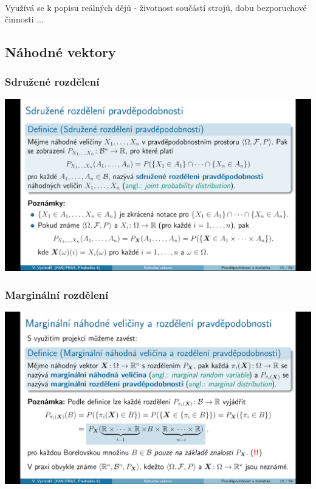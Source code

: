 \documentclass[12pt,a4paper]{article}
\begin{document}
\paragraph{} Využívá se k popisu reálných dějů - životnost součástí strojů, dobu bezporuchové činnosti ...

\subsection{Náhodné vektory}
\subsubsection{Sdružené rozdělení}
\begin{center}
	\includegraphics[scale=0.32]{img/sdruzene_rozdeleni}
\end{center}
\subsubsection{Marginální rozdělení}
\begin{center}
	\includegraphics[scale=0.32]{img/marginalni_rozdeleni}
\end{center}
\end{document}
